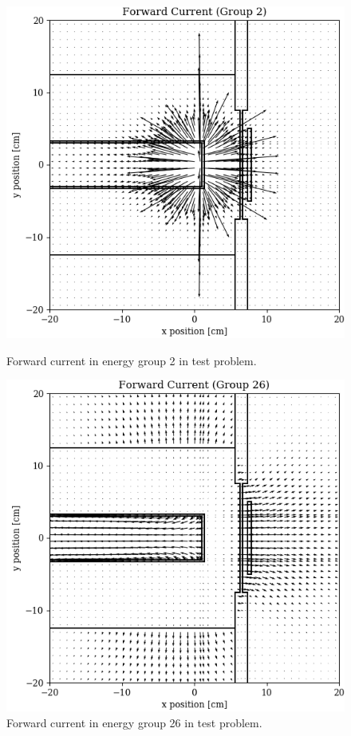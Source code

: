 \begin{figure}
  \begin{minipage}{0.49\linewidth}
    \centering
    \includegraphics[width=\linewidth]{content/testprob/current_fwd_g02.png}
    \caption{Forward current in energy group 2 in test problem.}
    \label{fig:testprob:current_fwd_g02}
  \end{minipage}
  \hfill
  \begin{minipage}{0.49\linewidth}
    \centering
    \includegraphics[width=\linewidth]{content/testprob/current_fwd_g26.png}
    \caption{Forward current in energy group 26 in test problem.}
    \label{fig:testprob:current_fwd_g26}
  \end{minipage}
\end{figure}

